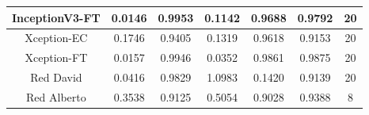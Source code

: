 \documentclass[11pt,a4paper]{article}
\theoremstyle{definition}
\begin{document}
\begin{table}[H]
\begin{tabular}{|c|c|c|c|c|c|c|}
\hline
InceptionV3-FT                                      & \textcolor[rgb]{0.129,0.129,0.129}{0.0146 } & \textcolor[rgb]{0.129,0.129,0.129}{0.9953 } & \textcolor[rgb]{0.129,0.129,0.129}{0.1142 }                                                                       & \textcolor[rgb]{0.129,0.129,0.129}{0.9688}                                                                             & \textcolor[rgb]{0.129,0.129,0.129}{0.9792}                                                                       & 20                                                                                                              \\
\hline
Xception-EC                                            & \textcolor[rgb]{0.129,0.129,0.129}{0.1746 } & \textcolor[rgb]{0.129,0.129,0.129}{0.9405 } & \textcolor[rgb]{0.129,0.129,0.129}{0.1319 }                                                                       & \textcolor[rgb]{0.129,0.129,0.129}{0.9618}                                                                             & \textcolor[rgb]{0.129,0.129,0.129}{0.9153}                                                                       & 20                                                                                                              \\
\hline
Xception-FT                        & \textcolor[rgb]{0.129,0.129,0.129}{0.0157 } & \textcolor[rgb]{0.129,0.129,0.129}{0.9946 } & \textcolor[rgb]{0.129,0.129,0.129}{0.0352 }                                                                       & \textcolor[rgb]{0.129,0.129,0.129}{0.9861}                                                                             & \textcolor[rgb]{0.129,0.129,0.129}{0.9875}                                                                       & 20                                                                                                              \\
\hline
Red David                        & \textcolor[rgb]{0.129,0.129,0.129}{0.0416 } & \textcolor[rgb]{0.129,0.129,0.129}{0.9829 } & \textcolor[rgb]{0.129,0.129,0.129}{1.0983 }                                                                       & \textcolor[rgb]{0.129,0.129,0.129}{0.1420 }                                                                             & \textcolor[rgb]{0.129,0.129,0.129}{0.9139}                                                                       & 20                                                                                                              \\
\hline
\rowcolor{green} Red Alberto                        & \textcolor[rgb]{0.129,0.129,0.129}{0.3538  } & \textcolor[rgb]{0.129,0.129,0.129}{0.9125  } & \textcolor[rgb]{0.129,0.129,0.129}{0.5054}                                                                       & \textcolor[rgb]{0.129,0.129,0.129}{0.9028}                                                                             & \textcolor[rgb]{0.129,0.129,0.129}{0.9388}                                                                       & 8                                                                                                              \\
\hline


\end{tabular}
\end{table}
\end{document}
